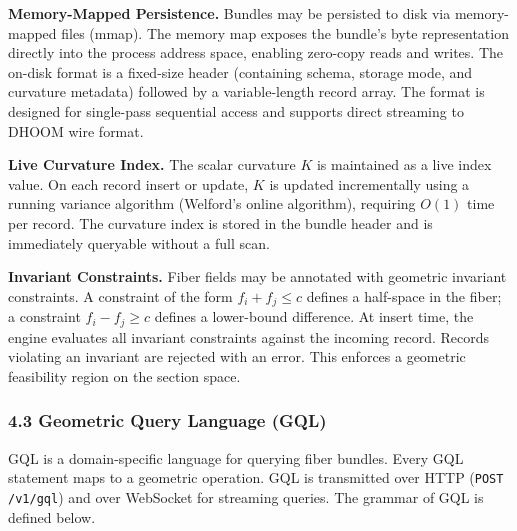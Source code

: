 \documentclass[11pt,letterpaper]{article}
\begin{document}
\textbf{Memory-Mapped Persistence.} Bundles may be persisted to disk via memory-mapped files (mmap). The memory map exposes the bundle's byte representation directly into the process address space, enabling zero-copy reads and writes. The on-disk format is a fixed-size header (containing schema, storage mode, and curvature metadata) followed by a variable-length record array. The format is designed for single-pass sequential access and supports direct streaming to DHOOM wire format.

\textbf{Live Curvature Index.} The scalar curvature $K$ is maintained as a live index value. On each record insert or update, $K$ is updated incrementally using a running variance algorithm (Welford's online algorithm), requiring $O(1)$ time per record. The curvature index is stored in the bundle header and is immediately queryable without a full scan.

\textbf{Invariant Constraints.} Fiber fields may be annotated with geometric invariant constraints. A constraint of the form $f_i + f_j \leq c$ defines a half-space in the fiber; a constraint $f_i - f_j \geq c$ defines a lower-bound difference. At insert time, the engine evaluates all invariant constraints against the incoming record. Records violating an invariant are rejected with an error. This enforces a geometric feasibility region on the section space.


\subsubsection*{4.3 Geometric Query Language (GQL)}

GQL is a domain-specific language for querying fiber bundles. Every GQL statement maps to a geometric operation. GQL is transmitted over HTTP (\texttt{POST /v1/gql}) and over WebSocket for streaming queries. The grammar of GQL is defined below.
\end{document}
